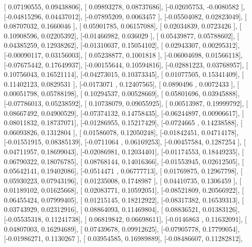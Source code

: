 \documentclass{article}
\begin{document}
       [ 0.07190555,  0.09438806],
       [ 0.09893278,  0.08737686],
       [-0.02695753, -0.0080582 ],
       [-0.04815296,  0.04437012],
       [-0.07895209,  0.0063457 ],
       [-0.05504082,  0.02823049],
       [ 0.08707032,  0.1660046 ],
       [ 0.05901785,  0.06157088],
       [ 0.02034839,  0.0723426 ],
       [ 0.10908596,  0.02205392],
       [-0.01466982,  0.036029  ],
       [ 0.05439877,  0.05788602],
       [ 0.04385259,  0.12938262],
       [-0.01310037,  0.15054102],
       [ 0.02943307,  0.00295312],
       [-0.00090117,  0.03156003],
       [ 0.05238877,  0.1001818 ],
       [-0.06004698,  0.01566118],
       [-0.07675442,  0.17649937],
       [-0.00155644,  0.10594816],
       [-0.02881223,  0.03768957],
       [ 0.10756043,  0.16521114],
       [-0.04273015,  0.10373345],
       [ 0.01077505,  0.15341409],
       [ 0.11402123,  0.0829531 ],
       [-0.0173071 ,  0.12407565],
       [ 0.0890496 ,  0.0072433 ],
       [ 0.00051798,  0.05788198],
       [ 0.10294537,  0.00528669],
       [ 0.05801696,  0.03945888],
       [-0.07786013,  0.05238592],
       [ 0.10738079,  0.09055925],
       [ 0.00513987,  0.19999792],
       [ 0.08667492,  0.04900529],
       [-0.07374132,  0.14758435],
       [-0.06244897,  0.00906617],
       [ 0.08011832,  0.18737071],
       [-0.01286955,  0.15217429],
       [-0.0724665 ,  0.14238588],
       [ 0.06093826,  0.1312804 ],
       [ 0.01586078,  0.12050248],
       [-0.01842451,  0.04714178],
       [-0.01551915,  0.08385139],
       [-0.0711064 ,  0.06169253],
       [-0.00457584,  0.1287254 ],
       [ 0.04711957,  0.18699043],
       [-0.02086981,  0.12034401],
       [-0.01174553,  0.18449235],
       [ 0.06790322,  0.18076785],
       [ 0.08768144,  0.14016366],
       [-0.01553945,  0.02612505],
       [ 0.05642141,  0.19402086],
       [-0.0514471 ,  0.06777713],
       [ 0.01769875,  0.12967798],
       [ 0.05930223,  0.07943196],
       [ 0.01235008,  0.1748987 ],
       [ 0.04410735,  0.1306459 ],
       [ 0.01189102,  0.01625668],
       [ 0.02083771,  0.10592051],
       [-0.08521809,  0.20566922],
       [ 0.06455424,  0.07999405],
       [ 0.01215145,  0.18212922],
       [-0.08317382,  0.16539313],
       [ 0.03743929,  0.02312916],
       [ 0.08864093,  0.11469804],
       [ 0.08836521,  0.01383126],
       [-0.05535318,  0.11241738],
       [ 0.06819842,  0.06698611],
       [-0.0146863 ,  0.11632091],
       [ 0.04807003,  0.16294689],
       [ 0.07439678,  0.09912625],
       [-0.07905778,  0.17799054],
       [-0.01986271,  0.1130267 ],
       [ 0.03954585,  0.16989889],
       [-0.08486607,  0.11282812],
\end{document}
